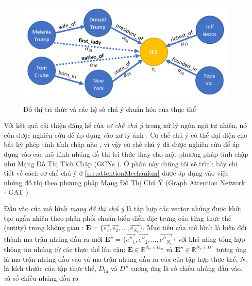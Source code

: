 \begin{figure}[htp]
	\centering
	\includegraphics[width=\textwidth,height=\textheight,keepaspectratio]{images/graph_example.png}
	\caption{Đồ thị tri thức và các hệ số chú ý chuẩn hóa của thực thể}
	\label{fig:graphExample}
\end{figure}

Với kết quả cải thiện đáng kể của \textit{cơ chế chú ý} trong xử lý ngôn ngữ tự nhiên, nó còn được nghiên cứu để áp dụng vào xử lý ảnh \cite{ramachandran2019stand}. Cơ chế chú ý có thể đại diện cho bất kỳ phép tính tính chập nào \cite{cordonnier2019relationship}, vì vậy cơ chế chú ý đã được nghiên cứu để áp dụng vào các mô hình nhúng đồ thị tri thức thay cho một phương pháp tính chập như Mạng Đồ Thị Tích Chập (GCNs \cite{kipf2016semi}). Ở phần này chúng tôi sẽ trình bày chi tiết về cách cơ chế chú ý ở \ref{sec:attentionMechanism} được áp dụng vào việc nhúng đồ thị theo phương pháp Mạng Đồ Thị Chú Ý (Graph Attention Network - GAT \cite{velivckovic2017graph}).

Đầu vào của mô hình \textit{mạng đồ thị chú ý} là tập hợp các vector nhúng được khởi tạo ngẫu nhiên theo phân phối chuẩn biểu diễn đặc trưng của từng thực thể (entity) trong không gian : $\mathbf{E} = \Big\{\overrightarrow{e_1}, \overrightarrow{e_2}, ...,  \overrightarrow{e_{N_e}}\Big\}$. Mục tiêu của mô hình là biến đổi thành ma trận nhúng đầu ra mới $\mathbf{E}'' = \Big\{\overrightarrow{e''_1}, \overrightarrow{e''_2}, ...,  \overrightarrow{e''_{N_e}}\Big\}$ với khả năng tổng hợp thông tin nhúng từ các thực thể lân cận; $\mathbf{E} \in \mathbb{R}^{N_e \times D_{\text{in}}}$ và $\mathbf{E}'' \in \mathbb{R}^{N_e \times D''}$ tương ứng là ma trận nhúng đầu vào và ma trận nhúng đầu ra của của tập hợp thực thể, $N_e$ là kích thước của tập thực thể, $D_{\text{in}}$ và $D''$ tương ứng là số chiều nhúng đầu vào, và số chiều nhúng đầu ra

